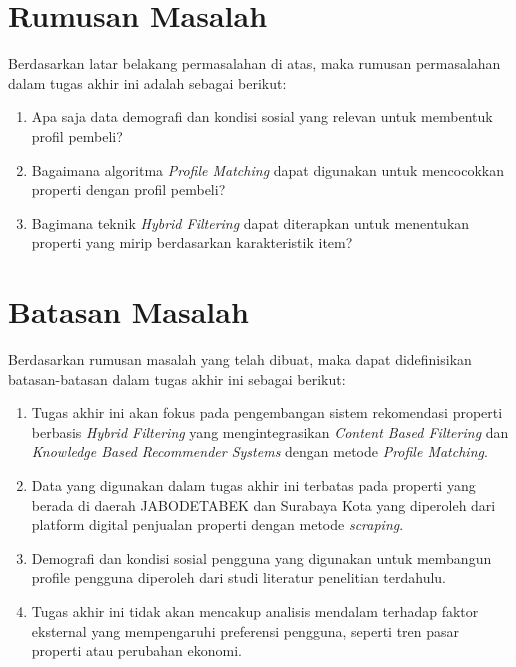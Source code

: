 \section{Rumusan Masalah}
\label{sec:permasalahan}

Berdasarkan latar belakang permasalahan di atas, maka rumusan permasalahan dalam tugas akhir ini adalah sebagai berikut:

\begin{enumerate}

  \item Apa saja data demografi dan kondisi sosial yang relevan untuk membentuk profil pembeli?

  \item Bagaimana algoritma \emph{Profile Matching} dapat digunakan untuk mencocokkan properti dengan profil pembeli?

  \item Bagimana teknik \emph{Hybrid Filtering} dapat diterapkan untuk menentukan properti yang mirip berdasarkan karakteristik item?
  
\end{enumerate}

\section{Batasan Masalah}
\label{sec:batasanmasalah}

Berdasarkan rumusan masalah yang telah dibuat, maka dapat didefinisikan batasan-batasan dalam tugas akhir ini sebagai berikut:

\begin{enumerate}

  \item Tugas akhir ini akan fokus pada pengembangan sistem rekomendasi properti berbasis \emph{Hybrid Filtering} yang mengintegrasikan \emph{Content Based Filtering} dan \emph{Knowledge Based Recommender Systems} dengan metode \emph{Profile Matching}.

  \item Data yang digunakan dalam tugas akhir ini terbatas pada properti yang berada di daerah JABODETABEK dan Surabaya Kota yang diperoleh dari platform digital penjualan properti dengan metode \emph{scraping}.

  \item Demografi dan kondisi sosial pengguna yang digunakan untuk membangun profile pengguna diperoleh dari studi literatur penelitian terdahulu.
  
  \item Tugas akhir ini tidak akan mencakup analisis mendalam terhadap faktor eksternal yang mempengaruhi preferensi pengguna, seperti tren pasar properti atau perubahan ekonomi.

\end{enumerate}

